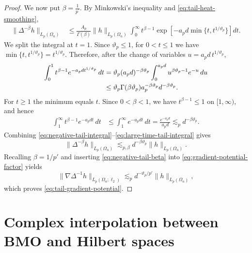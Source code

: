 \documentclass{amsart}
\numberwithin{equation}{section}
\theoremstyle{definition}
\theoremstyle{remark}
\newcommand{\1}{\mathbf 1}
\begin{document}
\begin{proof}
We now put $\beta=\frac1{p^{\prime}}$. By Minkowski's inequality and
\eqref{eq:tail-heat-smoothing},
\begin{align}
 \|\Delta^{-\beta}h\|_{L_{p}(\Omega_{n})}
 &\le
 \frac{A_p}{\Gamma(\beta)}
 \|h\|_{L_{p}(\Omega_{n})}
 \int_0^\infty
 t^{\beta-1}
 \exp\!\left[
   -a_pd\min\{t,t^{1/\vartheta_p}\}
 \right]dt.
 \label{eq:negative-tail-integral}
\end{align}
We split the integral at $t=1$.  Since $\vartheta_p\le1$, for $0<t\le1$ we have $\min\{t,t^{1/\vartheta_p}\}=t^{1/\vartheta_p}$. Therefore, after the change of variables
$u=a_pd\,t^{1/\vartheta_p}$,
\begin{align}
 \int_0^1
 t^{\beta-1}e^{-a_pd t^{1/\vartheta_p}}\,dt
 &=
 \vartheta_p
 (a_pd)^{-\beta\vartheta_p}
 \int_0^{a_pd}
 u^{\beta\vartheta_p-1}e^{-u}\,du
 \notag\\
 &\le
 \vartheta_p
 \Gamma(\beta\vartheta_p)
 a_p^{-\beta\vartheta_p}
 d^{-\beta\vartheta_p}.
 \label{eq:small-time-tail-integral}
\end{align}
For $t\ge1$ the minimum equals $t$.  Since
$0<\beta<1$, we have $t^{\beta-1}\le1$ on $[1,\infty)$, and hence
\begin{align}
 \int_1^\infty
 t^{\beta-1}e^{-a_pd t}\,dt
 &\le
 \int_1^\infty e^{-a_pd t}\,dt
 =
 \frac{e^{-a_pd}}{a_pd}
 \lesssim_p
 d^{-\beta\vartheta_p}.
 \label{eq:large-time-tail-integral}
\end{align}
Combining
\eqref{eq:negative-tail-integral}--\eqref{eq:large-time-tail-integral}
gives
\begin{equation}
 \|\Delta^{-\beta}h\|_{L_{p}(\Omega_{n})}
 \lesssim_{p,\beta}
 d^{-\beta\vartheta_p}\|h\|_{L_{p}(\Omega_{n})}.
 \label{eq:negative-tail-beta}
\end{equation}
Recalling $\beta=1/p'$ and inserting \eqref{eq:negative-tail-beta} into
\eqref{eq:gradient-potential-factor} yields
\[
 \|\nabla\Delta^{-1}h\|_{L_p(\Omega_n;\ell_2)}
 \lesssim_p
 d^{-\vartheta_p/p'}\|h\|_{L_p(\Omega_n)},
\]
which proves \eqref{eq:tail-gradient-potential}.
\end{proof}

\appendix 


\section{Complex interpolation between BMO and Hilbert spaces}\label{sec:product-interpolation}
\end{document}
